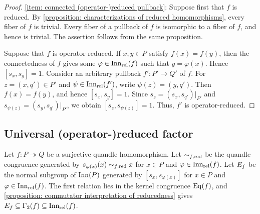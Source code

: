 \begin{proof}
\eqref{item: connected (operator-)reduced pullback}:
Suppose first that $f$ is reduced. By
\cref{proposition: characterizations of reduced homomorphisms},
every fiber of $f$ is trivial. Every fiber of a pullback of $f$
is isomorphic to a fiber of $f$, and hence is trivial. The assertion
follows from the same proposition.

Suppose that $f$ is operator-reduced.
If $x,y\in P$ satisfy $f(x)=f(y)$, then the connectedness of $f$
gives some $\varphi\in\operatorname{Inn_{rel}}(f)$ such that $y=\varphi(x)$.
Hence $[s_x,s_y]=1$.
Consider an arbitrary pullback $f'\colon P'\to Q'$ of $f$.
For $z=(x,q')\in P'$ and $\psi\in\operatorname{Inn_{rel}}(f')$, write
$\psi(z)=(y,q')$. Then $f(x)=f(y)$, and hence $[s_x,s_y]=1$.
Since $s_z=(s_x,s_{q'})|_{P'}$ and $s_{\psi(z)}=(s_y,s_{q'})|_{P'}$,
we obtain $[s_z,s_{\psi(z)}]=1$. Thus, $f'$ is operator-reduced.
\end{proof}






\subsection{Universal (operator-)reduced factor}
\label{subsection: universal relative reduced quotient}


Let $f\colon P\twoheadrightarrow Q$ be a surjective quandle homomorphism. 
Let $\sim_{f, \mathrm{red}}$ be the quandle congruence generated by $s_{\varphi(x)}(x)\mathrel{\sim_{f, \mathrm{red}}}x$ for $x\in P$ and $\varphi\in\operatorname{Inn_{rel}}(f)$. 
Let $E_{f}$ be the normal subgroup of $\operatorname{Inn}(P)$ generated by $[s_x,s_{\varphi(x)}]$ for $x\in P$ and $\varphi\in\operatorname{Inn_{rel}}(f)$.
The first relation lies in the kernel congruence $\operatorname{Eq}(f)$, and \cref{proposition: commutator interpretation of reducedness} gives $E_{f}\subseteq\Gamma_{2}(f)\subseteq \operatorname{Inn_{rel}}(f)$.


